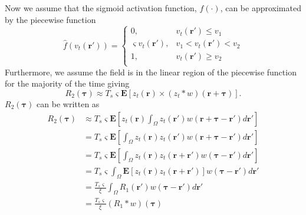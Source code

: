 \documentclass[]{article}
\begin{document}
Now we assume that the sigmoid activation function, $f(\cdot)$, can be approximated by the piecewise function
\begin{equation}
	\hat{f}(v_t(\mathbf{r}')) = \left\{ \begin{array}{ll}
		0, & v_t(\mathbf{r}') \le v_1 \\
		\varsigma v_t(\mathbf{r}'), &  v_1 < v_t(\mathbf{r}') < v_2 \\
		1, & v_t(\mathbf{r}') \ge v_2 \\ 
		\end{array}\right.
\end{equation}
Furthermore, we assume the field is in the linear region of the piecewise function for the majority of the time giving
\begin{equation}
	R_2(\boldsymbol{\tau}) \approx T_s \varsigma \mathbf{E}\left[ z_{t}\left(\mathbf{r}\right)\times \left(z_{t} \ast w\right)\left(\mathbf{r}+\boldsymbol{\tau}\right)\right].
\end{equation}
$R_2(\boldsymbol{\tau})$ can be written as
\begin{align}
	R_2(\boldsymbol{\tau}) &\approx T_s \varsigma \mathbf{E}\left[ z_{t}\left(\mathbf{r}\right)  \int_{\Omega}z_{t}\left(\mathbf{r'}\right) w\left(\mathbf{r}+\boldsymbol{\tau}-\mathbf{r'}\right) d\mathbf{r'} \right] \\
	&= T_s \varsigma \mathbf{E}\left[  \int_{\Omega}z_{t}\left(\mathbf{r}\right)z_{t}\left(\mathbf{r'}\right) w\left(\mathbf{r}+\boldsymbol{\tau}-\mathbf{r'}\right) d\mathbf{r'} \right] \\
	&= T_s \varsigma \mathbf{E}\left[  \int_{\Omega}z_{t}\left(\mathbf{r}\right)z_{t}\left(\mathbf{r}+\mathbf{r'}\right) w\left(\boldsymbol{\tau}-\mathbf{r'}\right) d\mathbf{r'} \right] \\
	&= T_s \varsigma   \int_{\Omega}\mathbf{E}\left[z_{t}\left(\mathbf{r}\right)z_{t}\left(\mathbf{r}+\mathbf{r'}\right) \right] w\left(\boldsymbol{\tau}-\mathbf{r}'\right) d\mathbf{r'} \nonumber \\
	&= \frac{T_s \varsigma}{\xi} \int_{\Omega} R_1(\mathbf{r'}) w\left(\boldsymbol{\tau}-\mathbf{r}'\right) d\mathbf{r'} \nonumber \\
	&= \frac{T_s \varsigma}{\xi} \left(R_1 \ast w\right)\left(\boldsymbol{\tau}\right)\\
\end{align}
\end{document}
